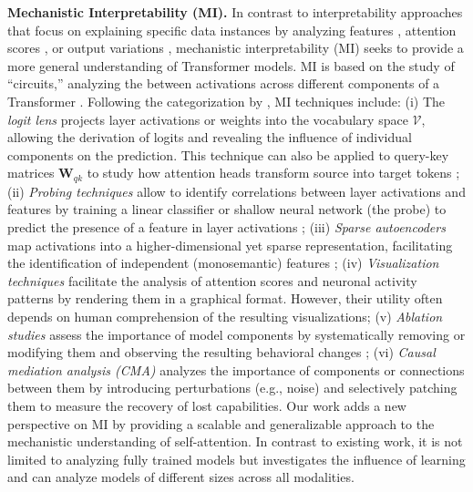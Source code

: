 %
\textbf{Mechanistic Interpretability (MI).}
%
In contrast to interpretability approaches that focus on explaining specific data instances by analyzing features \citep{Wu_Chen_2020, Lundstrom_Huang_2022}, attention scores \citep{Hoover_Strobelt_2020, Barkan_2021, Yeh_Chen_2023}, or output variations \citep{Jin_Jin_2020, Wang_Xu_2022}, mechanistic interpretability (MI) seeks to provide a more general understanding of Transformer models.
%
MI is based on the study of ``circuits,'' analyzing the between activations across different components of a Transformer  \citep{olahZoomIntroductionCircuits2020}.
%
Following the categorization by \citep{Rai_Zhou_Feng_Saparov_Yao_2024}, MI techniques include:
(i)
The \emph{logit lens} \citep{nostalgebraist_2020, Geva_Schuster_2021} projects layer activations or weights into the vocabulary space $\mathcal{V}$, allowing the derivation of logits and revealing the influence of individual components on the prediction.
This technique can also be applied to query-key matrices $\bm{W}_{qk}$ to study how attention heads transform source into target tokens \citep{darAnalyzingTransformersEmbedding2023};
%
(ii)
\emph{Probing techniques} allow to identify correlations between layer activations and features by training a linear classifier or shallow neural network (the probe) to predict the presence of a feature in layer activations \citep{Dalvi_Durrani_2019, gurnee2023finding};
%
(iii)
\emph{Sparse autoencoders} map activations into a higher-dimensional yet sparse representation, facilitating the identification of independent (monosemantic) features \citep{Huben_Cunningham_Smith_Ewart_Sharkey_2024, bricken2023monosemanticity};
%
(iv)
\emph{Visualization techniques} facilitate the analysis of attention scores \citep{olssonIncontextLearningInduction2022, Lieberum_Rahtz_Kramár_Nanda_Irving_Shah_Mikulik_2023} and neuronal activity patterns \citep{Elhage_Softmax_2023} by rendering them in a graphical format. However, their utility often depends on human comprehension of the resulting visualizations;
%
(v)
\emph{Ablation studies} assess the importance of model components by systematically removing or modifying them and observing the resulting behavioral changes \citep{olssonIncontextLearningInduction2022, wangInterpretabilityWildCircuit2022};
%
(vi)
\emph{Causal mediation analysis (CMA)} analyzes the importance of components \citep{Vig_Gehrmann_Belinkov_Qian_Nevo_Singer_Shieber_2020, Meng_Bau_Andonian_Belinkov_2022} or connections \citep{wangInterpretabilityWildCircuit2022, Goldowsky-Dill_MacLeod_Sato_Arora_2023} between them by introducing perturbations (e.g., noise) and selectively patching them to measure the recovery of lost capabilities.
%
Our work adds a new perspective on MI by providing a scalable and generalizable approach to the mechanistic understanding of self-attention.
In contrast to existing work, it is not limited to analyzing fully trained models but investigates the influence of learning and can analyze models of different sizes across all modalities.


